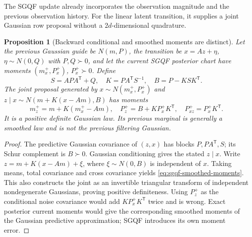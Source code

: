 \documentclass[11pt]{article}
\newtheorem{proposition}{Proposition}
\begin{document}
The SGQF update already incorporates the observation magnitude and the
previous observation history. For the linear latent transition, it supplies a
joint Gaussian row proposal without a $2d$-dimensional quadrature.
\begin{proposition}[Backward conditional and smoothed moments are distinct]
\label{prop:sgqf-backward}
Let the previous Gaussian guide be $N(m,P)$, the transition be $x=Az+\eta$,
$\eta\sim N(0,Q)$ with $P,Q\succ0$, and let the current SGQF posterior chart
have moments $(m_x^+,P_x^+)$, $P_x^+\succ0$. Define
\begin{equation}
 S=APA^{\mathsf T}+Q,\quad K=PA^{\mathsf T}S^{-1},\quad
 B=P-KSK^{\mathsf T}.
 \label{eq:sgqf-backward}
\end{equation}
The joint proposal generated by $x\sim N(m_x^+,P_x^+)$ and
$z\mid x\sim N(m+K(x-Am),B)$ has moments
\begin{equation}
 m_z^+=m+K(m_x^+-Am),\quad P_z^+=B+KP_x^+K^{\mathsf T},\quad
 P_{xz}^+=P_x^+K^{\mathsf T}.
 \label{eq:sgqf-smoothed-moments}
\end{equation}
It is a positive definite Gaussian law. Its previous marginal is generally a
smoothed law and is not the previous filtering Gaussian.
\end{proposition}
\begin{proof}
The predictive Gaussian covariance of $(z,x)$ has blocks
$P,PA^{\mathsf T},S$; its Schur complement is $B\succ0$. Gaussian conditioning
gives the stated $z\mid x$. Write $z=m+K(x-Am)+\xi$, where
$\xi\sim N(0,B)$ is independent of $x$. Taking means, total covariance and
cross covariance yields \eqref{eq:sgqf-smoothed-moments}. This also constructs
the joint as an invertible triangular transform of independent nondegenerate
Gaussians, proving positive definiteness. Using $P_z^+$ as the conditional
noise covariance would add $KP_x^+K^{\mathsf T}$ twice and is wrong. Exact
posterior current moments would give the corresponding smoothed moments of
the Gaussian predictive approximation; SGQF introduces its own moment error.
\end{proof}
\end{document}
